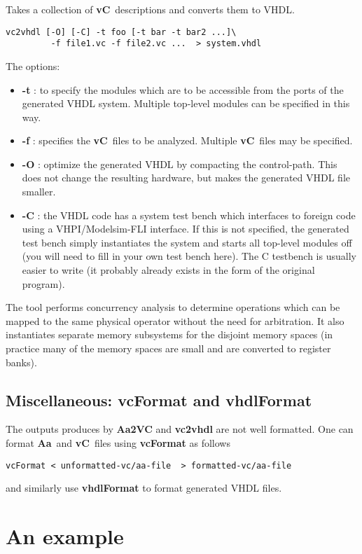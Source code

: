 \documentclass{article}
\newcommand{\Aa}{{\bf Aa}~}
\newcommand{\vC}{{\bf vC}~}
\begin{document}
Takes a collection of \vC descriptions and converts them to
VHDL.
\begin{verbatim}
vc2vhdl [-O] [-C] -t foo [-t bar -t bar2 ...]\
         -f file1.vc -f file2.vc ...  > system.vhdl
\end{verbatim}

The options:
\begin{itemize}
\item {\bf -t} : to specify the modules which are to be 
accessible from the ports of the generated VHDL system.
Multiple top-level modules can be specified in this way.
\item {\bf -f} : specifies the \vC files to be analyzed. 
Multiple \vC files may be specified.
\item {\bf -O} : optimize the generated VHDL by compacting
the control-path.  This does not change the resulting
hardware, but makes the generated VHDL file smaller.
\item {\bf -C} : the VHDL code has a system test bench which
interfaces to foreign code using a VHPI/Modelsim-FLI interface.
If this is not specified, the  generated test bench simply
instantiates the system and starts all top-level modules
off (you will need to fill in your own test bench here).
The C testbench is usually easier to write (it probably
already exists in the form of the original program).
\end{itemize}

The tool performs concurrency analysis to determine operations which
can be mapped to the same physical operator without the need for
arbitration.  It also instantiates separate memory subsystems for
the disjoint memory spaces (in practice many of the memory spaces
are small and are converted to register banks).

\subsection{Miscellaneous: {\bf vcFormat} and {\bf vhdlFormat}}

The outputs produces by {\bf Aa2VC} and {\bf vc2vhdl} are
not well formatted.  One can format \Aa and \vC files
using  {\bf vcFormat} as follows
\begin{verbatim}
vcFormat < unformatted-vc/aa-file  > formatted-vc/aa-file
\end{verbatim}
and similarly use {\bf vhdlFormat} to format generated
VHDL files.


\section{An example} \label{sec:Example}
\end{document}
